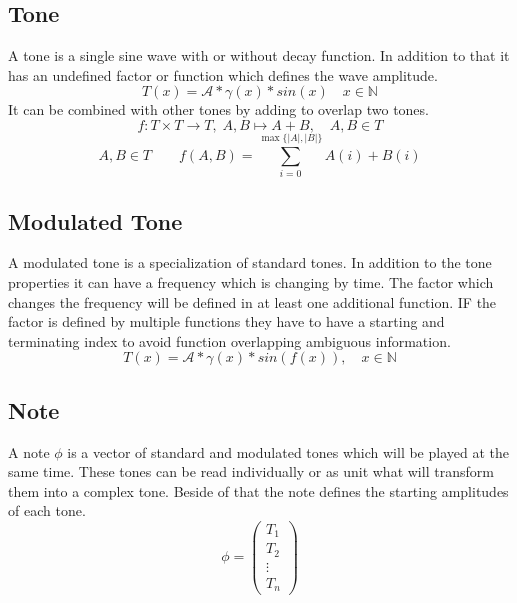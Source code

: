\documentclass[a4paper,12pt]{report}
\newcommand{\N}{\mathbb{N}}
\begin{document}
	\subsection{Tone}
	A tone is a single sine wave with or without decay function. In addition to that it has an undefined factor or function which defines the wave amplitude. 
	\begin{equation*}
		T(x)=\mathcal{A} * \gamma(x) * sin(x) \quad x\in\N
	\end{equation*}
	It can be combined with other tones by adding to overlap two tones.
	\begin{equation*}
		f:T \times T \rightarrow T, \; A,B \mapsto A+B, \quad A,B\in T
	\end{equation*}
	\begin{equation*}
		A,B \in T \qquad f(A,B)=\sum_{i=0}^{\max\{|A| ,|B|\}} A(i)+B(i)
	\end{equation*}
	
	\subsection{Modulated Tone}
	A modulated tone is a specialization of standard tones. In addition to the tone properties it can have a frequency which is changing by time. The factor which changes the frequency will be defined in at least one additional function. IF the factor is defined by multiple functions they have to have a starting and terminating index to avoid function overlapping ambiguous information.
	\begin{equation*}
		T(x)=\mathcal{A} * \gamma(x) * sin(f(x)), \quad x\in\N
	\end{equation*}
	
	\subsection{Note}
	A note
	\begin{math}
	\phi
	\end{math} 
	is a vector of standard and modulated tones which will be played at the same time. These tones can be read individually or as unit what will transform them into a complex tone. Beside of that the note defines the starting amplitudes of each tone.
	\begin{equation*}
		\phi=
		\begin{pmatrix}
			T_1\\
			T_2\\
			\vdots\\
			T_n
		\end{pmatrix}
	\end{equation*}
	
\end{document}
